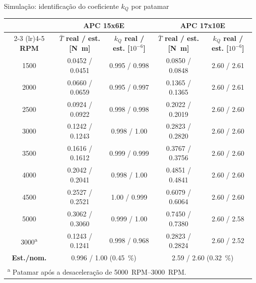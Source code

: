 \begin{frame}{Simulação: identificação do coeficiente $k_Q$ por patamar}
  \centering
  \begin{fundobranco}
  \begin{tabular}{ccccc}
    \toprule
    & \multicolumn{2}{c}{\textbf{APC 15x6E}} & \multicolumn{2}{c}{\textbf{APC 17x10E}} \\
    \cmidrule(lr){2-3} \cmidrule(lr){4-5}
    \textbf{RPM} &
    \textbf{$\bar{T}$ real / est. [\si{\newton\meter}]} &
    \textbf{$k_{Q}$ real / est. [$10^{-6}$]} &
    \textbf{$\bar{T}$ real / est. [\si{\newton\meter}]} &
    \textbf{$k_{Q}$ real / est. [$10^{-6}$]} \\
    \midrule
    1500 & \num{0,0452} / \num{0,0451} & \num{0,995} / \num{0,998} & \num{0,0850} / \num{0,0848} & \num{2,60} / \num{2,61} \\
    2000 & \num{0,0660} / \num{0,0659} & \num{0,995} / \num{0,997} & \num{0,1365} / \num{0,1365} & \num{2,60} / \num{2,61} \\
    2500 & \num{0,0924} / \num{0,0922} & \num{0,998} / \num{0,998} & \num{0,2022} / \num{0,2019} & \num{2,60} / \num{2,60} \\
    3000 & \num{0,1242} / \num{0,1243} & \num{0,998} / \num{1,00}  & \num{0,2823} / \num{0,2820} & \num{2,60} / \num{2,60} \\
    3500 & \num{0,1616} / \num{0,1612} & \num{0,999} / \num{0,999} & \num{0,3767} / \num{0,3756} & \num{2,60} / \num{2,60} \\
    4000 & \num{0,2042} / \num{0,2041} & \num{0,998} / \num{1,00}  & \num{0,4851} / \num{0,4841} & \num{2,60} / \num{2,60} \\
    4500 & \num{0,2527} / \num{0,2521} & \num{1,00} / \num{0,999}  & \num{0,6079} / \num{0,6064} & \num{2,60} / \num{2,60} \\
    5000 & \num{0,3062} / \num{0,3060} & \num{0,999} / \num{1,00}  & \num{0,7450} / \num{0,7380} & \num{2,60} / \num{2,58} \\
    3000\textsuperscript{a} & \num{0,1243} / \num{0,1241} & \num{0,998} / \num{0,968} & \num{0,2823} / \num{0,2824} & \num{2,60} / \num{2,52} \\
    \midrule
    \textbf{Est./nom.} & \multicolumn{2}{c}{\num{0,996} / \num{1,00} (\SI{0,45}{\percent})} &
        \multicolumn{2}{c}{\num{2,59} / \num{2,60} (\SI{0,32}{\percent})} \\
    \bottomrule
    \multicolumn{5}{l}{\textsuperscript{a} Patamar após a desaceleração de \SIrange{5000}{3000}{RPM}.}
  \end{tabular}
  \end{fundobranco}
  \fonte
\end{frame}

